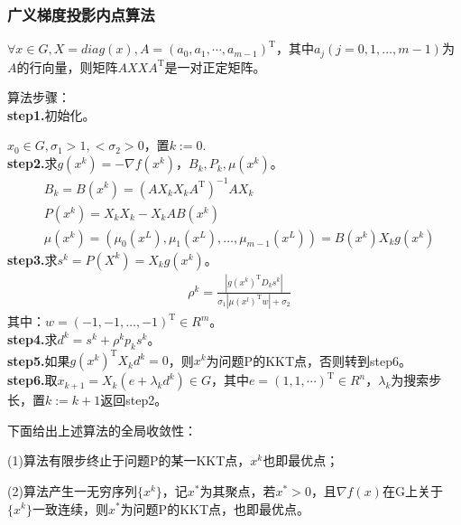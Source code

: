         \subsubsection{广义梯度投影内点算法}
            \begin{lemma}
            $\forall x \in G,X=diag(x),A=(a_0,a_1,\cdots,a_{m-1})^\mathrm{T} $，其中$a_j(j=0,1,\ldots,m-1)$为$A$的行向量，则矩阵$AXXA^\mathrm{T} $是一对正定矩阵。
            \end{lemma}
            \par
            算法步骤：\\
            \textbf{step1.}初始化。
            \par
            $x_0\in G,{\sigma}_1>1,<{\sigma}_2>0$，置$k:=0$.\\
            \textbf{step2.}求$g(x^k)=-\nabla f(x^k)$，$B_k,P_k,\mu(x^k)$。
            \begin{align*}
                &B_{k}=B(x^k)=(AX_kX_kA^\mathrm{T} )^{-1}AX_k\\
                &P(x^k)=X_kX_k-X_kAB(x^k)\\
                &\mu (x^k) =({\mu}_0(x^L),{\mu}_1(x^L),\ldots,{\mu}_{m-1}(x^L))=B(x^k)X_kg(x^k)
                \end{align*}
            \textbf{step3.}求$s^k=P(X^k)=X_kg(x^k)$。
            \begin{align*}
                &{\rho}^k=\frac{|g(x^k)^\mathrm{T} D_ks^k|}{{\sigma}_1|\mu (x^l)^\mathrm{T} w|+{\sigma}_2}
                \end{align*}
                其中：$w=  (-1,-1,\dots,-1)^\mathrm{T} \in R^m$。\\
            \textbf{step4.}求$d^k=s^k+{\rho}^kp_ks^k$。\\
            \textbf{step5.}如果$g(x^k)^\mathrm{T} X_kd^k=0$，则$x^k$为问题P的KKT点，否则转到step6。\\
            \textbf{step6.}取$x_{k+1}=X_k(e+{\lambda}_kd^k)\in G$，其中$e=(1,1,\cdots)^\mathrm{T} \in R^n$，${\lambda}_k$为搜索步长，置$k:=k+1$返回step2。
            \par
            下面给出上述算法的全局收敛性：
            \par
            (1)算法有限步终止于问题P的某一KKT点，$x^k$也即最优点；
            \par
            (2)算法产生一无穷序列$\{x^k\}$，记$x^*$为其聚点，若$x^*>0$，且$\nabla f(x)$在G上关于$\{x^k\}$一致连续，则$x^*$为问题P的KKT点，也即最优点。
